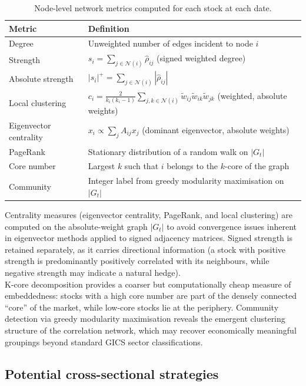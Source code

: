 \documentclass{article}
\begin{document}
\begin{table}[H]
\centering
\caption{Node-level network metrics computed for each stock at each date.}
\label{tab:node_features}
\begin{tabular}{lp{9.5cm}}
\toprule
\textbf{Metric} & \textbf{Definition} \\
\midrule
Degree & Unweighted number of edges incident to node $i$ \\
Strength & $s_i = \sum_{j \in \mathcal{N}(i)} \hat\rho_{ij}$ (signed weighted degree) \\
Absolute strength & $|s_i|^+ = \sum_{j \in \mathcal{N}(i)} |\hat\rho_{ij}|$ \\
Local clustering & $c_i = \frac{2}{k_i(k_i-1)} \sum_{j,k \in \mathcal{N}(i)} \tilde{w}_{ij}\tilde{w}_{ik}\tilde{w}_{jk}$ (weighted, absolute weights) \\
Eigenvector centrality & $x_i \propto \sum_j A_{ij} x_j$ (dominant eigenvector, absolute weights) \\
PageRank & Stationary distribution of a random walk on $|G_t|$ \\
Core number & Largest $k$ such that $i$ belongs to the $k$-core of the graph \\
Community & Integer label from greedy modularity maximisation on $|G_t|$ \\
\bottomrule
\end{tabular}
\end{table}

Centrality measures (eigenvector centrality, PageRank, and local clustering) are computed on the absolute-weight graph $|G_t|$ to avoid convergence issues inherent in eigenvector methods applied to signed adjacency matrices. Signed strength is retained separately, as it carries directional information (a stock with positive strength is predominantly positively correlated with its neighbours, while negative strength may indicate a natural hedge).\\

K-core decomposition provides a coarser but computationally cheap measure of embeddedness: stocks with a high core number are part of the densely connected ``core'' of the market, while low-core stocks lie at the periphery. Community detection via greedy modularity maximisation reveals the emergent clustering structure of the correlation network, which may recover economically meaningful groupings beyond standard GICS sector classifications.

\subsection{Potential cross-sectional strategies}
\end{document}
